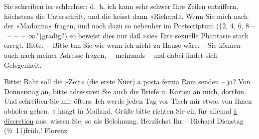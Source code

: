 \pstart
           Sie schreiben i{\geminationm}er schlechter; d. h. ich kann sehr
               schwer {\pb}Ihre Zeilen entziffern,
               höchstens die Unterschrift, und die heisst dann »Richard«. Wenn Sie mich nach der
               »Madonna«
               fragen, und noch dazu so nebenher im Postscriptum ({\{}2, 4, 6, 8 – – – – ∞?{\}}gradig?) so beweist dies nur daß »sie« Ihre
               sexuelle Phantasie stark erregt. Bitte. – Bitte tun Sie wie wenn ich nicht zu Hause
               wäre. – Sie können auch nach meiner Adresse fragen, – mehrmals – {\pb}und dabei findet sich
               Gelegenheit.\pend
           
\pstart
           Bitte: Bahr soll die »Zeit« (die erste Nu{\geminationm}er) \uline{a posta ferma}{ }\uline{Rom} senden – ja? Von Donnerstag an, bitte adressiren Sie auch die
               Briefe u. Karten an mich, dorthin. Und schreiben Sie mir öfters: Ich werde jeden Tag
               vor Tisch mir etwas von Ihnen abholen gehen. \label{K_L00375-2v}\label{K_L00375-2}« hängt in Mailand. Grüße bitte richten Sie
               ein für allemal \uline{à discretion} aus, wissen Sie, so als
               Belohnung. Herzlichst Ihr –\pend
           \pstart \spacefill\mbox{Richard}\pend{}
\pstart
           Dienstag{ }\introOben{}(½ 11)\introOben{}{ }früh,! Florenz\pend
           \endnumbering{}  \newcommand{\dateiname}{L00375}\newcommand{\titel}{Richard Beer-Hofmann an Arthur Schnitzler, [2. 10. 1894]}\newcommand{\editorInnen}{Herausgegeben von Martin Anton Müller}

